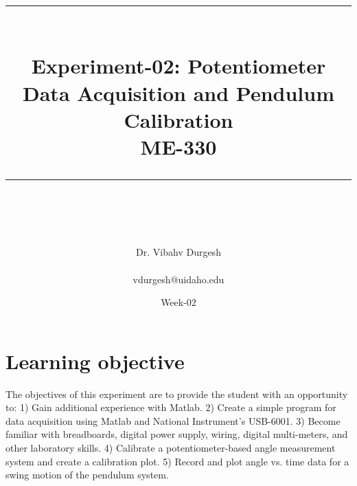 \documentclass{article} %
\newcommand{\HRule}{\rule{\linewidth}{0.5mm}} %
\begin{document}


\title{
\begin{center}
\HRule \\[0.4cm]
{\Huge \bfseries Experiment-02: Potentiometer Data Acquisition and Pendulum Calibration \\[0.5cm] \Large ME-330}\\[0.4cm] %
\HRule \\[1.5cm]
\end{center}
}
\author{\Huge Dr. Vibahv Durgesh \\ \\ \LARGE vdurgesh@uidaho.edu \\[2cm]} %
\date{Week-02} %
\maketitle

\tableofcontents

\clearpage

\section{Learning objective}
The objectives of this experiment are to provide the student with an opportunity to:
1)	Gain additional experience with Matlab.
2)	Create a simple program for data acquisition using Matlab and National Instrument’s USB-6001.
3)	Become familiar with breadboards, digital power supply, wiring, digital multi-meters, and other laboratory skills.
4)	Calibrate a potentiometer-based angle measurement system and create a calibration plot.
5)	Record and plot angle vs. time data for a swing motion of the pendulum system.
\end{document}
